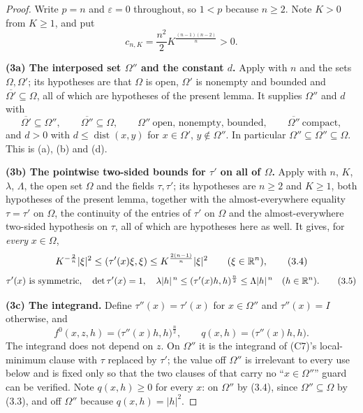 \begin{proof}
Write $p=n$ and $\varepsilon=0$ throughout, so $1<p$ because $n\ge2$.  Note
$K>0$ from $K\ge1$, and put
\[
c_{n,K}=\frac{n^2}2K^{\frac{(n-1)(n-2)}n}>0 .
\]

\textbf{(3a) The interposed set $\Omega''$ and the constant $d$.}  Apply
 with $n$ and the sets $\Omega,\Omega'$; its
hypotheses are that $\Omega$ is open, $\Omega'$ is nonempty and bounded and
$\overline{\Omega'}\subseteq\Omega$, all of which are hypotheses of the present
lemma.  It supplies $\Omega''$ and $d$ with
\[
\overline{\Omega'}\subseteq\Omega'',\qquad
\overline{\Omega''}\subseteq\Omega,\qquad
\Omega''\ \text{open, nonempty, bounded},\qquad
\overline{\Omega''}\ \text{compact},
\tag{3.3}
\]
and $d>0$ with $d\le\operatorname{dist}(x,y)$ for $x\in\Omega'$,
$y\notin\Omega''$.  In particular
$\Omega''\subseteq\overline{\Omega''}\subseteq\Omega$.  This is (a), (b) and
(d).

\textbf{(3b) The pointwise two-sided bounds for $\tau'$ on all of $\Omega$.}
Apply  with $n$, $K$, $\lambda$, $\Lambda$,
the open set $\Omega$ and the fields $\tau,\tau'$; its hypotheses are $n\ge2$ and
$K\ge1$, both hypotheses of the present lemma, together with the
almost-everywhere equality $\tau=\tau'$ on $\Omega$, the continuity of the
entries of $\tau'$ on $\Omega$ and the almost-everywhere two-sided hypothesis on
$\tau$, all of which are hypotheses here as well.  It gives, for \emph{every}
$x\in\Omega$,
\[
K^{-\frac2n}|\xi|^2\le(\tau'(x)\xi,\xi)\le K^{\frac{2(n-1)}n}|\xi|^2
\qquad(\xi\in\mathbb{R}^n),
\tag{3.4}
\]
\[
\tau'(x)\ \text{is symmetric},\quad \det\tau'(x)=1,\quad
\lambda|h|^{\,n}\le(\tau'(x)h,h)^{\frac n2}\le\Lambda|h|^{\,n}\quad(h\in\mathbb{R}^n).
\tag{3.5}
\]

\textbf{(3c) The integrand.}  Define $\tau''(x)=\tau'(x)$ for $x\in\Omega''$ and
$\tau''(x)=I$ otherwise, and
\[
f^0(x,z,h)=\bigl(\tau''(x)h,h\bigr)^{\frac n2},\qquad
q(x,h)=\bigl(\tau''(x)h,h\bigr).
\]
The integrand does not depend on $z$.  On $\Omega''$ it is the integrand of
(C7)'s local-minimum clause with $\tau$ replaced by $\tau'$; the value off
$\Omega''$ is irrelevant to every use below and is fixed only so that the two
clauses of  that carry no ``$x\in\Omega''$''
guard can be verified.  Note $q(x,h)\ge0$ for every $x$: on $\Omega''$ by (3.4),
since $\Omega''\subseteq\Omega$ by (3.3), and off $\Omega''$ because
$q(x,h)=|h|^2$.


\end{proof}
